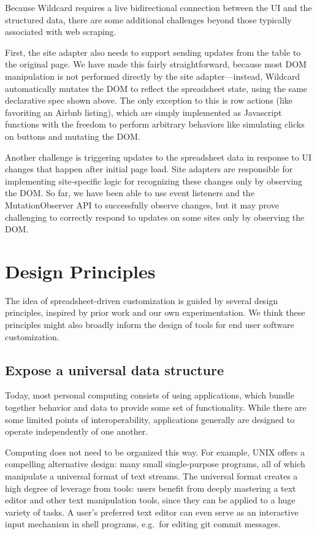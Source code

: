 \documentclass[english,submission]{programming}
\begin{document}
Because Wildcard requires a live bidirectional connection between the UI
and the structured data, there are some additional challenges beyond
those typically associated with web scraping.

First, the site adapter also needs to support sending updates from the
table to the original page. We have made this fairly straightforward,
because most DOM manipulation is not performed directly by the site
adapter---instead, Wildcard automatically mutates the DOM to reflect the
spreadsheet state, using the same declarative spec shown above. The only
exception to this is row actions (like favoriting an Airbnb listing),
which are simply implemented as Javascript functions with the freedom to
perform arbitrary behaviors like simulating clicks on buttons and
mutating the DOM.

Another challenge is triggering updates to the spreadsheet data in
response to UI changes that happen after initial page load. Site
adapters are responsible for implementing site-specific logic for
recognizing these changes only by observing the DOM. So far, we have
been able to use event listeners and the MutationObserver API to
successfully observe changes, but it may prove challenging to correctly
respond to updates on some sites only by observing the DOM.

\hypertarget{sec:design-principles}{%
\section{Design Principles}\label{sec:design-principles}}

The idea of spreadsheet-driven customization is guided by several design
principles, inspired by prior work and our own experimentation. We think
these principles might also broadly inform the design of tools for end
user software customization.

\hypertarget{expose-a-universal-data-structure}{%
\subsection{Expose a universal data
structure}\label{expose-a-universal-data-structure}}

Today, most personal computing consists of using applications, which
bundle together behavior and data to provide some set of functionality.
While there are some limited points of interoperability, applications
generally are designed to operate independently of one another.

Computing does not need to be organized this way. For example, UNIX
offers a compelling alternative design: many small single-purpose
programs, all of which manipulate a universal format of text streams.
The universal format creates a high degree of leverage from tools: users
benefit from deeply mastering a text editor and other text manipulation
tools, since they can be applied to a huge variety of tasks. A user's
preferred text editor can even serve as an interactive input mechanism
in shell programs, e.g.~for editing git commit messages.
\end{document}
